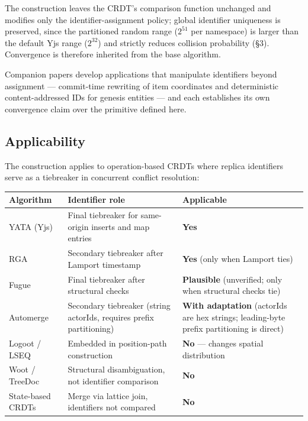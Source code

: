 The construction leaves the CRDT's comparison function unchanged and modifies only the identifier-assignment policy; global identifier uniqueness is preserved, since the partitioned random range ($2^{51}$ per namespace) is larger than the default Yjs range ($2^{32}$) and strictly reduces collision probability (§3). Convergence is therefore inherited from the base algorithm.

Companion papers develop applications that manipulate identifiers beyond assignment --- commit-time rewriting of item coordinates\cite{plexus:liminal} and deterministic content-addressed IDs for genesis entities\cite{plexus:genesis} --- and each establishes its own convergence claim over the primitive defined here.

\subsection{Applicability}

The construction applies to operation-based CRDTs where replica identifiers serve as a tiebreaker in concurrent conflict resolution:

\begin{table}[ht]
\centering
\small
\begin{tabularx}{\textwidth}{@{}lXX@{}}
\toprule
\textbf{Algorithm} & \textbf{Identifier role} & \textbf{Applicable} \\
\midrule
YATA (Yjs)\cite{yata2016} & Final tiebreaker for same-origin inserts and map entries & \textbf{Yes} \\
RGA\cite{rga2011} & Secondary tiebreaker after Lamport timestamp & \textbf{Yes} (only when Lamport ties) \\
Fugue & Final tiebreaker after structural checks & \textbf{Plausible} (unverified; only when structural checks tie) \\
Automerge\cite{kleppmann2017automerge} & Secondary tiebreaker (string actorIds, requires prefix partitioning) & \textbf{With adaptation} (actorIds are hex strings; leading-byte prefix partitioning is direct) \\
Logoot / LSEQ & Embedded in position-path construction & \textbf{No} --- changes spatial distribution \\
Woot / TreeDoc & Structural disambiguation, not identifier comparison & \textbf{No} \\
State-based CRDTs & Merge via lattice join, identifiers not compared & \textbf{No} \\
\bottomrule
\end{tabularx}
\end{table}

